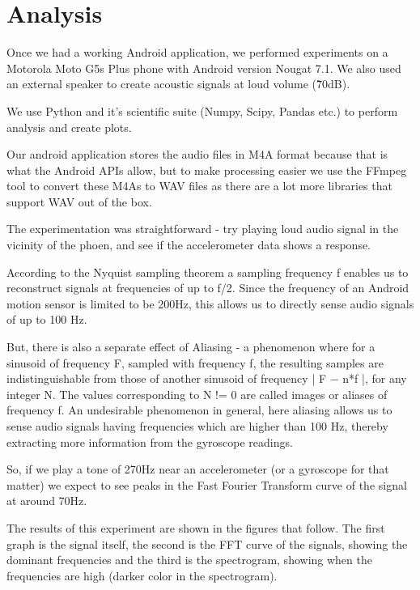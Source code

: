 \chapter{Analysis}

Once we had a working Android application, we performed experiments on a Motorola Moto G5s Plus phone with Android version Nougat 7.1. We also used an external speaker to create acoustic signals at loud volume (\~70dB).

We use Python and it's scientific suite (Numpy, Scipy, Pandas etc.) to perform analysis and create plots.

Our android application stores the audio files in M4A format because that is what the Android APIs allow, but to make processing easier we use the FFmpeg tool to convert these M4As to WAV files as there are a lot more libraries that support WAV out of the box.

The experimentation was straightforward - try playing loud audio signal in the vicinity of the phoen, and see if the accelerometer data shows a response.

According to the Nyquist sampling theorem a sampling frequency f enables us to reconstruct signals at frequencies of up to f/2. Since the frequency of an Android motion sensor is limited to be 200Hz, this allows us to directly sense audio signals of up to 100 Hz.

But, there is also a separate effect of Aliasing \cite{gyrophone} - a phenomenon where for a sinusoid of frequency F, sampled with frequency f, the resulting samples are indistinguishable from those of another sinusoid of frequency | F − n*f |, for any integer N. The values corresponding to N != 0 are called images or aliases of frequency f. An undesirable phenomenon in general, here aliasing allows us to sense audio signals having frequencies which are higher than 100 Hz, thereby extracting more information from the gyroscope readings.

So, if we play a tone of 270Hz near an accelerometer (or a gyroscope for that matter) we expect to see peaks in the Fast Fourier Transform curve of the signal at around 70Hz.

The results of this experiment are shown in the figures that follow. The first graph is the signal itself, the second is the FFT curve of the signals, showing the dominant frequencies and the third is the spectrogram, showing when the frequencies are high (darker color in the spectrogram).


